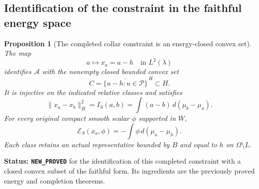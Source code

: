\documentclass[11pt,a4paper]{article}
\numberwithin{equation}{section}
\newtheorem{proposition}[theorem]{Proposition}
\theoremstyle{definition}
\theoremstyle{remark}
\begin{document}
\subsection{Identification of the constraint in the faithful energy space}

\begin{proposition}[The completed collar constraint is an energy-closed convex set]
\label{prop:r6-completed-energy-convex-set}
The map
\[
         a\longmapsto x_a=a-h\quad\text{in }L^2(\lambda)
\]
identifies $\mathscr A$ with the nonempty closed bounded convex set
\[
          C=\overline{\{u-h:u\in\mathscr P\}}^{\,H}\subset H.
\]
It is injective on the indicated relative classes and satisfies
\begin{equation}
 \|x_a-x_b\|_H^2=I_S(a,b)
      =\int(a-b)\,d(\mu_b-\mu_a).
 \label{eq:r6-energy-completion-isometry}
\end{equation}
For every original compact smooth scalar $\phi$ supported in $W$,
\begin{equation}
 \mathcal E_S(x_a,\phi)
        =-\int\phi\,d(\mu_a-\mu_h).
 \label{eq:r6-energy-current-pairing}
\end{equation}
Each class retains an actual representative bounded by $B$ and equal to
$h$ on $\Omega\setminus L$.
\end{proposition}

\noindent\textbf{Status: \texttt{NEW\_PROVED}} for the identification
of this completed constraint with a closed convex subset of the faithful
form. Its ingredients are the previously proved energy and completion
theorems.
\end{document}
